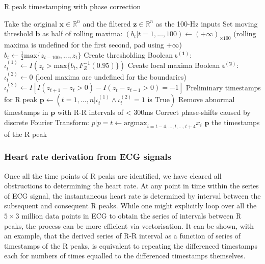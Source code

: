 \documentclass[
]{article}
\begin{document}
\begin{algorithm}
\caption{R peak timestamping with phase correction}
\begin{algorithmic}[1]
\STATE Take the original $\mathbf{x} \in \mathbb{R}^n$ and the filtered $\mathbf{z} \in \mathbb{R}^n$ as the 100-Hz inputs
\STATE Set moving threshold $\mathbf{b}$ as half of rolling maxima:
\STATE $(b_t | t = 1, ..., 100) \leftarrow (+\infty)_{\times 100}$ (rolling maxima is undefined for the first second, pad using $+\infty$)
\STATE $b_t \leftarrow \frac{1}{2}\text{max}\{z_{t - 100}, ..., z_t\}$
\ENDFOR
\STATE Create thresholding Boolean $\boldsymbol{\iota^{(1)}}$:
\STATE $\iota^{(1)}_t \leftarrow I(z_t > \text{max}\{b_t, F^{-1}_{Z}(0.95)\})$
\ENDFOR
\STATE Create local maxima Boolean $\boldsymbol{\iota^{(2)}}$:
\STATE $\iota^{(2)}_t \leftarrow 0$ (local maxima are undefined for the boundaries)
\ENDFOR
{}
\STATE $\iota^{(2)}_t \leftarrow I[I(z_{t + 1} - z_t > 0) - I(z_t - z_{t - 1} > 0) = -1]$
\ENDFOR
\STATE Preliminary timestamps for R peak $\mathbf{p} \leftarrow (t = 1, ..., n | \iota^{(1)}_t \land \iota^{(2)}_t = 1 \text{ is True})$
\STATE Remove abnormal timestamps in $\mathbf{p}$ with R-R intervals of < 300ms
\STATE Correct phase-shifts caused by discrete Fourier Transform:
\STATE $p | p = t \leftarrow \text{argmax}_{i = t - 4, ..., t, ..., t + 4} x_i$
\ENDFOR
\RETURN $\mathbf{p}$ the timestamps of the R peak
\end{algorithmic}
\end{algorithm}

\newpage

\hypertarget{heart-rate-derivation-from-ecg-signals}{%
\subsubsection{Heart rate derivation from ECG
signals}\label{heart-rate-derivation-from-ecg-signals}}

Once all the time points of R peaks are identified, we have cleared all
obstructions to determining the heart rate. At any point in time within
the series of ECG signal, the instantaneous heart rate is determined by
interval between the subsequent and consequent R peaks. While one might
explicitly loop over all the \(5 \times 3\) million data points in ECG
to obtain the series of intervals between R peaks, the process can be
more efficient via vectorisation. It can be shown, with an example, that
the derived series of R-R interval as a function of series of timestamps
of the R peaks, is equivalent to repeating the differenced timestamps
each for numbers of times equalled to the differenced timestamps
themselves.
\end{document}
